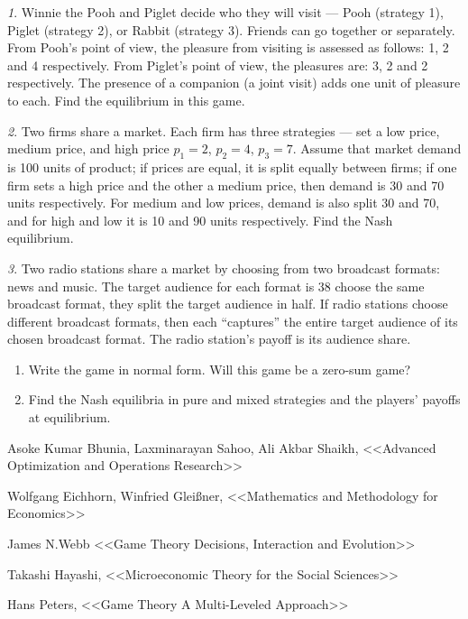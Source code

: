 \documentclass[12pt]{article}
\theoremstyle{remark}
\newtheorem{exercise}{}[subsection]
\begin{document}
\begin{exercise}
Winnie the Pooh and Piglet decide who they will visit --- Pooh
(strategy 1), Piglet (strategy 2), or Rabbit (strategy 3).
Friends can go together or separately. From Pooh's point
of view, the pleasure from visiting is assessed as follows: 1, 2
and 4 respectively. From Piglet's point of view, the pleasures are: 3,
2 and 2 respectively. The presence of a companion (a joint visit)
adds one unit of pleasure to each. Find
the equilibrium in this game.
\end{exercise}

\begin{exercise}
Two firms share a market. Each firm has three strategies --- set a
low price, medium price, and high price $p_1=2$, $p_2=4$,
$p_3=7$. Assume that market demand is 100 units
of product; if prices are equal, it is split equally between firms;
if one firm sets a high price and the other a medium price, then demand
is 30 and 70 units respectively. For medium and low
prices, demand is also split 30 and 70, and for high and low
it is 10 and 90 units respectively. Find the
Nash equilibrium.
\end{exercise}

\begin{exercise}
Two radio stations share a market by choosing from two broadcast formats: news and music.
The target audience for each format is 38%
choose the same broadcast format, they split the target audience in half.
If radio stations choose different broadcast formats, then each ``captures''
the entire target audience of its chosen broadcast format. The radio station's payoff is its audience share.
\begin{enumerate}
	\item Write the game in normal form.
	Will this game be a zero-sum game? %
	\item Find the Nash equilibria in pure and mixed strategies
	and the players' payoffs at equilibrium.
\end{enumerate}
\end{exercise}

\begin{thebibliography}{99}

 Asoke Kumar Bhunia, Laxminarayan Sahoo, Ali Akbar Shaikh,
<<Advanced Optimization and Operations Research>>

 Wolfgang Eichhorn, Winfried Gleißner,
<<Mathematics and Methodology for Economics>>

 James N.Webb <<Game Theory Decisions, Interaction and Evolution>>

 Takashi Hayashi, <<Microeconomic Theory for the Social Sciences>>

 Hans Peters, <<Game Theory A Multi-Leveled Approach>>

\end{thebibliography}


\end{document}

